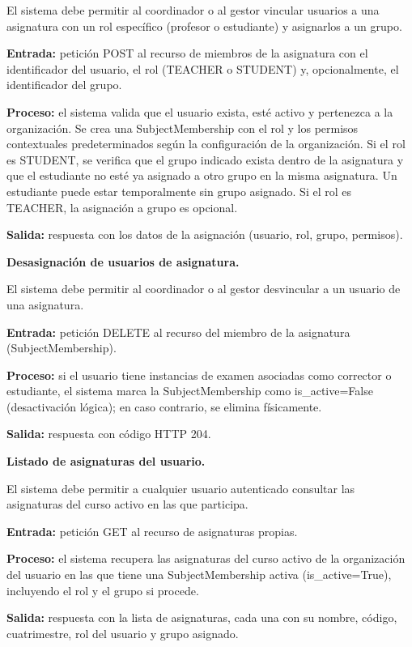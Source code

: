 \begin{functional}
\begin{functional}
    El sistema debe permitir al coordinador o al gestor vincular usuarios a una asignatura con un rol específico (profesor o estudiante) y asignarlos a un grupo.

    \textbf{Entrada:} petición POST al recurso de miembros de la asignatura con el identificador del usuario, el rol (TEACHER o STUDENT) y, opcionalmente, el identificador del grupo.

    \textbf{Proceso:} el sistema valida que el usuario exista, esté activo y pertenezca a la organización. Se crea una SubjectMembership con el rol y los permisos contextuales predeterminados según la configuración de la organización. Si el rol es STUDENT, se verifica que el grupo indicado exista dentro de la asignatura y que el estudiante no esté ya asignado a otro grupo en la misma asignatura. Un estudiante puede estar temporalmente sin grupo asignado. Si el rol es TEACHER, la asignación a grupo es opcional.

    \textbf{Salida:} respuesta con los datos de la asignación (usuario, rol, grupo, permisos).

    \item \textbf{Desasignación de usuarios de asignatura.}

    El sistema debe permitir al coordinador o al gestor desvincular a un usuario de una asignatura.

    \textbf{Entrada:} petición DELETE al recurso del miembro de la asignatura (SubjectMembership).

    \textbf{Proceso:} si el usuario tiene instancias de examen asociadas como corrector o estudiante, el sistema marca la SubjectMembership como is\_active=False (desactivación lógica); en caso contrario, se elimina físicamente.

    \textbf{Salida:} respuesta con código HTTP 204.

    \item \textbf{Listado de asignaturas del usuario.}

    El sistema debe permitir a cualquier usuario autenticado consultar las asignaturas del curso activo en las que participa.

    \textbf{Entrada:} petición GET al recurso de asignaturas propias.

    \textbf{Proceso:} el sistema recupera las asignaturas del curso activo de la organización del usuario en las que tiene una SubjectMembership activa (is\_active=True), incluyendo el rol y el grupo si procede.

    \textbf{Salida:} respuesta con la lista de asignaturas, cada una con su nombre, código, cuatrimestre, rol del usuario y grupo asignado.


\end{functional}
\end{functional}
